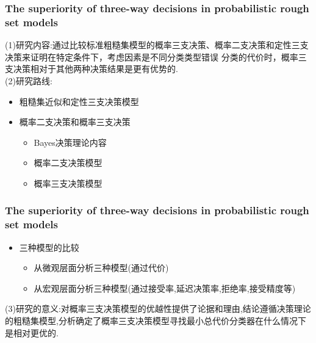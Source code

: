 \documentclass[aspectratio=169]{beamer}
\begin{document}
\begin{frame}
  \frametitle{The superiority of three-way decisions in probabilistic rough set models}
  \vspace{0.3cm}
  (1)研究内容:通过比较标准粗糙集模型的概率三支决策、概率二支决策和定性三支决策来证明在特定条件下，考虑因素是不同分类类型错误
  分类的代价时，概率三支决策相对于其他两种决策结果是更有优势的.\\
  \vspace{0.2cm}
  (2)研究路线:
  \begin{itemize}
    \item 粗糙集近似和定性三支决策模型
    \vspace{0.2cm}
    \item 概率二支决策和概率三支决策
    \begin{itemize}
      \item Bayes决策理论内容
      \item 概率二支决策模型
      \item 概率三支决策模型
    \end{itemize}
  \end{itemize}
\end{frame}


\begin{frame}
  \frametitle{The superiority of three-way decisions in probabilistic rough set models}
  \vspace{0.3cm}
  \begin{itemize}
    \item 三种模型的比较
    \begin{itemize}
      \item 从微观层面分析三种模型(通过代价)
      \item 从宏观层面分析三种模型(通过接受率,延迟决策率,拒绝率,接受精度等)
    \end{itemize}
  \end{itemize}
  \vspace{0.2cm}
  (3)研究的意义:对概率三支决策模型的优越性提供了论据和理由,结论遵循决策理论的粗糙集模型,分析确定了概率三支决策模型寻找最小总代价分类器在什么情况下是相对更优的.
\end{frame}
\end{document}
